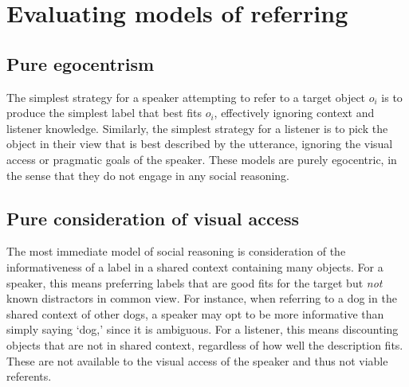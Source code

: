 \documentclass[manuscript]{stjour}
\begin{document}

\section{Evaluating models of referring}

\subsection{Pure egocentrism}

The simplest strategy for a speaker attempting to refer to a target object $o_i$ is to produce the simplest label that best fits $o_i$, effectively ignoring context and listener knowledge.  Similarly, the simplest strategy for a listener is to pick the object in their view that is best described by the utterance, ignoring the visual access or pragmatic goals of the speaker. These models are purely egocentric, in the sense that they do not engage in any social reasoning. 

\subsection{Pure consideration of visual access}

The most immediate model of social reasoning is consideration of the informativeness of a label in a shared context containing many objects. For a speaker, this means preferring labels that are good fits for the target but \emph{not} known distractors in common view. For instance, when referring to a dog in the shared context of other dogs, a speaker may opt to be more informative than simply saying `dog,' since it is ambiguous. For a listener, this means discounting objects that are not in shared context, regardless of how well the description fits. These are not available to the visual access of the speaker and thus not viable referents. 
\end{document}

